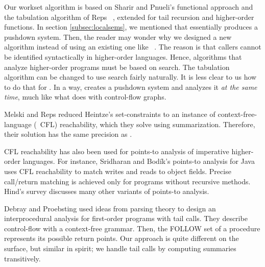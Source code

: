 \documentclass{LMCS}
\theoremstyle{definition} \newtheorem{property}[thm]{Property}
\begin{document}
Our workset algorithm is based on Sharir and Pnueli's functional approach 
\cite[pg.\ 207]{book/flowanalysis/81/sharir/interproc} and the tabulation 
algorithm of Reps \etal~\cite{conf/popl/95/reps/interproc}, extended for tail
recursion and higher-order functions.
In section \ref{subsec:localsems}, we mentioned that \cfat{} essentially 
produces a pushdown system.
Then, the reader may wonder why we designed a new algorithm instead of using an
existing one like ~\cite{journal/entcs/97/finkel/pds, 
conf/concur/97/bouajjani/pds}.
The reason is that callers cannot be identified syntactically in higher-order
languages.
Hence, algorithms that analyze higher-order programs must be based on search.
The tabulation algorithm can be changed to use search fairly naturally.
It is less clear to us how to do that for .
In a way, \cfat{} creates a pushdown system and analyzes it \emph{at the same
time}, much like what \kcfa{} does with control-flow graphs.

Melski and Reps \cite{journal/tcs/00/melski/cflReachab} reduced Heintze's
set-constraints \cite{diss/cmu/92/heintze} to an instance of 
context-free-language (\abbrev\ CFL) reachability, which they solve using
summarization.
Therefore, their solution has the same precision as .

CFL reachability has also been used for points-to analysis of imperative 
higher-order languages.
For instance, Sridharan and Bod\'ik's points-to analysis for Java
\cite{conf/pldi/06/sridharan/pointsTo} uses CFL reachability to match writes
and reads to object fields.
Precise call/return matching is achieved only for programs without recursive
methods. 
Hind's survey \cite{conf/paste/01/hind/survey} discusses many other
variants of points-to analysis.

Debray and Proebsting \cite{journal/toplas/97/debray/tailcall} used ideas from
parsing theory to design an interprocedural analysis for first-order programs 
with tail calls.
They describe control-flow with a context-free grammar.
Then, the {\small FOLLOW} set of a procedure represents its possible 
return points.
Our approach is quite different on the surface, but similar in spirit; 
we handle tail calls by computing summaries transitively.
\end{document}
